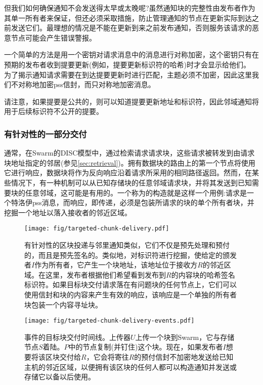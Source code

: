 但我们如何确保通知不会发送得太早或太晚呢?虽然通知块的完整性由发布者作为其单一所有者来保证，但还必须采取措施，防止管理通知的节点在更新实际到达之前发送它们。最理想的情况是不能在更新到来之前发布通知，否则服务该请求的恶意节点可能会产生错误警报。

一个简单的方法是用一个密钥对请求消息中的消息进行对称加密，这个密钥只有在预期的发布者收到提要更新(例如，提要更新标识符的哈希)时才会显示给他们。
为了揭示通知请求需要在到达提要更新时进行匹配，主题必须不加密，因此这里我们不对称地加密pss信封，而只对称地加密消息。

请注意，如果提要是公共的，则可以知道提要更新地址和标识符，因此邻域通知将用于后续标识符不公开的提要。

\subsubsection{有针对性的一部分交付}

通常，在Swarm的DISC模型中，通过检索请求请求块，这些请求被转发到由请求块地址指定的邻居(参见\ref{sec:retrieval})。拥有数据块的路由上的第一个节点将使用它进行响应，数据块将作为反向响应沿着请求所采用的相同路径返回。然而，在某些情况下，有一种机制可以从已知存储块的任意邻域请求块，并将其发送到已知需要块的任意邻域，这可能是有用的。一个称为的构造就是这样一个用例:请求是一个特洛伊pss消息，而响应，即传递，必须是包装所请求的块的单个所有者块，并挖掘一个地址以落入接收者的邻近区域。  


\begin{figure}[htbp]
\centering
\texttt{[image: fig/targeted-chunk-delivery.pdf]}      
\caption[目标块交付\statusgreen]{有针对性的区块投递与邻里通知类似，它们不仅是预先处理和预付的，而且是预先签名的。类似地，对标识符进行挖掘，使给定的颁发者$I$作为所有者，它产生一个块地址，该地址位于接收方$R$的邻近区域。在这里，发布者根据他们希望看到发布到$R$的内容块的哈希签名标识符。如果目标块交付请求落在有问题块的任何节点上，它们可以使用信封和块的内容来产生有效的响应，该响应是一个单独的所有者块包装一个内容寻址块。}
\label{fig:targeted-chunk-delivery}
\end{figure}

\begin{figure}[htbp]
\centering
\texttt{[image: fig/targeted-chunk-delivery-events.pdf]}
\caption[事件的目标块交付时间\statusgreen]{事件的目标块交付时间线。上传器$U$上传一个块到Swarm，它与存储节点$S$着陆。$P$中的节点复制(并钉住)这个块。现在，如果发布者$I$想要将该区块交付给$R$，它会将寄往$R$的预付信封不加密地发送给已知主机的邻近区域，以便拥有该区块的任何人都可以构造通知并发送或存储它以备以后使用。}
\label{fig:targeted-chunk-delivery-events}
\end{figure}



